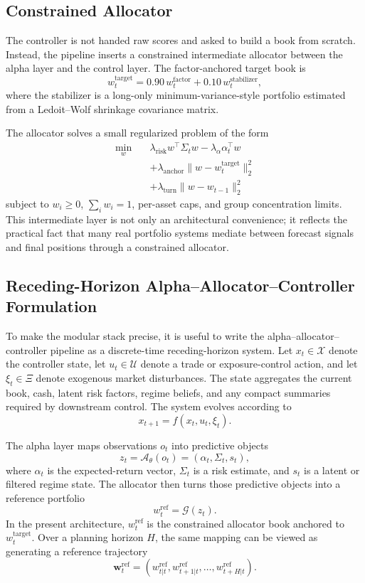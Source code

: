 \documentclass[10pt,twocolumn]{article}
\begin{document}
\subsection{Constrained Allocator}

The controller is not handed raw scores and asked to build a book from scratch.
Instead, the pipeline inserts a constrained intermediate allocator between the
alpha layer and the control layer. The factor-anchored target book is
\[
w_t^{\text{target}} =
0.90\,w_t^{\text{factor}} +
0.10\,w_t^{\text{stabilizer}},
\]
where the stabilizer is a long-only minimum-variance-style portfolio estimated
from a Ledoit--Wolf shrinkage covariance matrix.

The allocator solves a small regularized problem of the form
\[
\begin{aligned}
\min_w \quad &
\lambda_{\mathrm{risk}} w^\top \Sigma_t w
- \lambda_{\alpha}\alpha_t^\top w \\
&+ \lambda_{\mathrm{anchor}}\lVert w - w_t^{\mathrm{target}} \rVert_2^2 \\
&+ \lambda_{\mathrm{turn}}\lVert w - w_{t-1} \rVert_2^2
\end{aligned}
\]
subject to $w_i \ge 0$, $\sum_i w_i = 1$, per-asset caps, and group
concentration limits. This intermediate layer is not only an architectural
convenience; it reflects the practical fact that many real portfolio systems
mediate between forecast signals and final positions through a constrained
allocator.
\subsection{Receding-Horizon Alpha--Allocator--Controller Formulation}

To make the modular stack precise, it is useful to write the
alpha--allocator--controller pipeline as a discrete-time receding-horizon
system. Let $x_t \in \mathcal{X}$ denote the controller state, let
$u_t \in \mathcal{U}$ denote a trade or exposure-control action, and let
$\xi_t \in \Xi$ denote exogenous market disturbances. The state aggregates the
current book, cash, latent risk factors, regime beliefs, and any compact
summaries required by downstream control. The system evolves according to
\[
x_{t+1} = f(x_t, u_t, \xi_t).
\]

The alpha layer maps observations $o_t$ into predictive objects
\[
z_t = \mathcal{A}_{\theta}(o_t) = (\alpha_t, \Sigma_t, s_t),
\]
where $\alpha_t$ is the expected-return vector, $\Sigma_t$ is a risk estimate,
and $s_t$ is a latent or filtered regime state. The allocator then turns those
predictive objects into a reference portfolio
\[
w_t^{\mathrm{ref}} = \mathcal{G}(z_t).
\]
In the present architecture, $w_t^{\mathrm{ref}}$ is the constrained allocator
book anchored to $w_t^{\text{target}}$. Over a planning horizon $H$, the same
mapping can be viewed as generating a reference trajectory
\[
\mathbf{w}_t^{\mathrm{ref}} =
\left(
w_{t|t}^{\mathrm{ref}},
w_{t+1|t}^{\mathrm{ref}},
\dots,
w_{t+H|t}^{\mathrm{ref}}
\right).
\]
\end{document}

